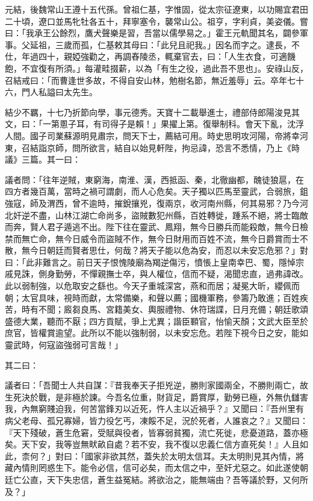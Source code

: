 \begin{pinyinscope}
 元結，後魏常山王遵十五代孫。曾祖仁基，字惟固，從太宗征遼東，以功賜宜君田二十頃，遼口並馬牝牡各五十，拜寧塞令，襲常山公。祖亨，字利貞，美姿儀。嘗曰：「我承王公餘烈，鷹犬聲樂是習，吾當以儒學易之。」霍王元軌聞其名，闢參軍事。父延祖，三歲而孤，仁基敕其母曰：「此兒且祀我。」因名而字之。逮長，不仕，年過四十，親婭強勸之，再調舂陵丞，輒棄官去，曰：「人生衣食，可適饑飽，不宜復有所須。」每灌畦掇薪，以為「有生之役，過此吾不思也」。安祿山反，召結戒曰：「而曹逢世多故，不得自安山林，勉樹名節，無近羞辱」云。卒年七十六，門人私謚曰太先生。



 結少不羈，十七乃折節向學，事元德秀。天寶十二載舉進士，禮部侍郎陽浚見其文，曰：「一第慁子耳，有司得子是賴！」果擢上第。復舉制科。會天下亂，沈浮人間。國子司業蘇源明見肅宗，問天下士，薦結可用。時史思明攻河陽，帝將幸河東，召結詣京師，問所欲言，結自以始見軒陛，拘忌諱，恐言不悉情，乃上《時議》三篇。其一曰：



 議者問：「往年逆賊，東窮海，南淮、漢，西抵函、秦，北徹幽都，醜徒狼扈，在四方者幾百萬，當時之禍可謂劇，而人心危矣。天子獨以匹馬至靈武，合弱旅，鉏強寇，師及渭西，曾不逾時，摧銳攘兇，復兩京，收河南州縣，何其易邪？乃今河北奸逆不盡，山林江湖亡命尚多，盜賊數犯州縣，百姓轉徙，踵系不絕，將士臨敵而奔，賢人君子遁逃不出。陛下往在靈武、鳳翔，無今日勝兵而能殺敵，無今日檢禁而無亡命，無今日威令而盜賊不作，無今日財用而百姓不流，無今日爵賞而士不散，無今日朝廷而賢者思仕，何哉？將天子能以危為安，而忍以未安忘危邪？」對曰：「此非難言之。前日天子恨愧陵廟為羯逆傷污，憤悵上皇南幸巴、蜀，隱悼宗戚見誅，側身勤勞，不憚親撫士卒，與人權位，信而不疑，渴聞忠直，過弗諱改。此以弱制強，以危取安之繇也。今天子重城深宮，燕和而居；凝冕大昕，纓佩而朝；太官具味，視時而獻，太常備樂，和聲以薦；國機軍務，參籌乃敢進；百姓疾苦，時有不聞；廄芻良馬、宮籍美女、輿服禮物、休符瑞諜，日月充備；朝廷歌頌盛德大業，聽而不厭；四方貢賦，爭上尤異；諧臣顐官，怡愉天顏；文武大臣至於庶官，皆權賞逾望。此所以不能以強制弱，以未安忘危。若陛下視今日之安，能如靈武時，何寇盜強弱可言哉！」



 其二曰：



 議者曰：「吾聞士人共自謀：『昔我奉天子拒兇逆，勝則家國兩全，不勝則兩亡，故生死決於戰，是非極於諫。今吾名位重，財貨足，爵賞厚，勤勞已極，外無仇讎害我，內無窮賤迫我，何苦當鋒刃以近死，忤人主以近禍乎？』又聞曰：『吾州里有病父老母、孤兄寡婦，皆力役乞丐，凍餒不足，況於死者，人誰哀之？』又聞曰：『天下殘破，蒼生危窘，受賦與役者，皆寡弱貧獨，流亡死徙，悲憂道路，蓋亦極矣。天下安，我等豈無畎畝自處？若不安，我不復以忠義仁信方直死矣！』人且如此，柰何？」對曰：「國家非欲其然，蓋失於太明太信耳。夫太明則見其內情，將藏內情則罔惑生下。能令必信，信可必矣，而太信之中，至奸尤惡之。如此遂使朝廷亡公直，天下失忠信，蒼生益冤結。將欲治之，能無端由？吾等議於野，又何所及？」




\end{pinyinscope}
